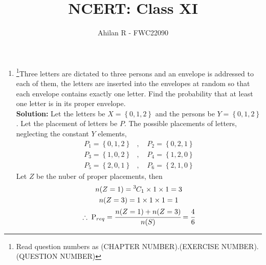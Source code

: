 \documentclass{article}
\providecommand{\cbrak}[1]{\ensuremath{\left\{#1\right\}}}
\newcommand{\solution}{\noindent \textbf{Solution: }}
\newcommand*{\permcomb}[4][0mu]{{{}^{#3}\mkern#1#2_{#4}}}
\newcommand*{\comb}[1][-1mu]{\permcomb[#1]{C}}
\begin{document}
\title{NCERT: Class XI}
\author{\Large Ahilan R - FWC22090}
\date{}

\maketitle

\begin{enumerate}[label=16.\arabic{enumi}.\arabic{enumii}]%
\setcounter{enumi}{3}
\setcounter{enumii}{6}

\item \footnote{Read question numbers as (CHAPTER NUMBER).(EXERCISE NUMBER).(QUESTION NUMBER)}Three letters are dictated to three persons and an envelope is addressed to each of them, the letters are inserted into the envelopes at random so that each envelope contains exactly one letter. Find the probability that at least one letter is in its proper envelope.\\[1ex]
	\solution
		Let the letters be $X = \cbrak{0,1,2}$ and the persons be $Y = \cbrak{0,1,2}$. Let the placement of letters be $P$.
  The possible placements of letters, neglecting the constant $Y$ elements, %
  \begin{align*}
	  P_1 = \cbrak{0,1,2} &, \quad P_2 = \cbrak{0,2,1} \\
	  P_3 = \cbrak{1,0,2} &, \quad P_4 = \cbrak{1,2,0} \\
	  P_5 = \cbrak{2,0,1} &, \quad P_6 = \cbrak{2,1,0} 
  \end{align*}
  Let $Z$ be the nuber of proper placements, then
  \begin{gather}
	  n(Z=1) = \comb{3}{1} \times 1 \times 1 = 3 \\
	  n(Z=3) = 1 \times 1 \times 1 = 1 \\
	  \therefore \; \text{P}_{req} = \cfrac{n(Z=1)+n(Z=3)}{n(S)} = \cfrac{4}{6} %
  \end{gather}
		
\noindent{}

\end{enumerate}
\end{document}
